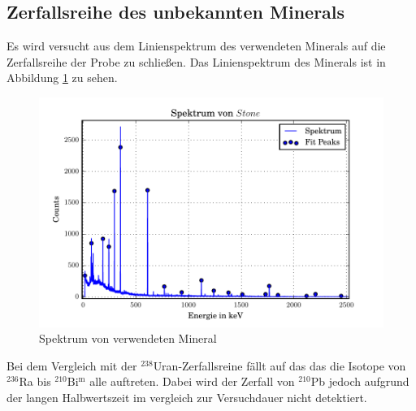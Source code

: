 \subsection{Zerfallsreihe des unbekannten Minerals}
Es wird versucht aus dem Linienspektrum des verwendeten Minerals auf die Zerfallsreihe der Probe zu schließen. Das Linienspektrum des Minerals ist in Abbildung \ref{fig:Stone} zu sehen.
\begin{figure}[htpb]
  \centering
  \includegraphics[width=\textwidth]{./build/SpektSt.pdf}
  \caption{Spektrum von verwendeten Mineral}
  \label{fig:Stone}
\end{figure}
Bei dem Vergleich mit der $^{238}$Uran-Zerfallsreine fällt auf das das die Isotope von $^{236}$Ra bis $^{210}$Bi$^\text{m}$ alle auftreten. Dabei wird der Zerfall von $^{210}$Pb jedoch aufgrund der langen Halbwertszeit im vergleich zur Versuchdauer nicht detektiert.
